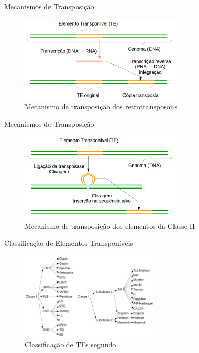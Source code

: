 \documentclass[%
  xcolor=table,%
  10pt,%
  aspectratio = 169,%
  compress,%
  t,%
]{beamer}%
\begin{document}
\begin{frame}{}{Mecanismos de Transposição}
    \begin{figure}
        \centering
        \includegraphics[width=0.7\textwidth]{./Figuras/retrotransposons.png}
        \caption{Mecanismo de transposição dos retrotransposons}
        \label{fig:transposition-1}
    \end{figure}
\end{frame}

\begin{frame}{}{Mecanismos de Transposição}
    \begin{figure}
        \centering
        \includegraphics[width=0.7\textwidth]{./Figuras/transposons.png}
        \caption{Mecanismo de transposição dos elementos da Classe II}
        \label{fig:transposition-2}
    \end{figure}
\end{frame}

\begin{frame}{}{Classificação de Elementos Transponíveis}
    \begin{figure}
        \centering
        \includegraphics[width=0.6\textwidth]{./Figuras/te-classes.png}
        \caption{Classificação de TEs segundo \cite{Wicker2007}}
        \label{fig:classes}
    \end{figure}
\end{frame}
\end{document}
